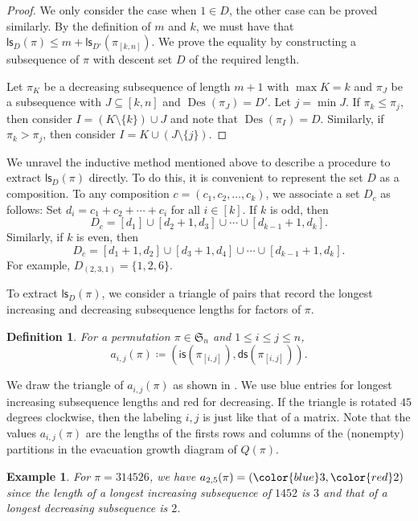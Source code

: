 \documentclass[12pt]{article}
\newcommand{\is}{\mathsf{is}}
\newcommand{\ds}{\mathsf{ds}}
\newcommand{\ls}{\mathsf{ls}}
\newcommand{\Des}{\operatorname{Des}}
\newcommand{\s}{\mathfrak{S}}
\newtheorem{definition}[theorem]{Definition}
\newtheorem{example}[theorem]{Example}
\theoremstyle{definition}
\begin{document}
\begin{proof}
    We only consider the case when $1 \in D$, the other case can be proved similarly. 
    By the definition of $m$ and $k$, we must have that $\ls_D(\pi) \leq m + \ls_{D'}(\pi_{[k, n]})$. 
    We prove the equality by constructing a subsequence of $\pi$ with descent set $D$ of the required length.

    Let $\pi_K$ be a decreasing subsequence of length $m + 1$ with $\max K = k$ and $\pi_J$ be a subsequence with $J \subseteq [k, n]$ and $\Des(\pi_J) = D'$. 
    Let $j = \min J$. 
    If $\pi_k \leq \pi_j$, then consider $I = (K \setminus \{k\}) \cup J$ and note that $\Des(\pi_I) = D$. 
    Similarly, if $\pi_k > \pi_j$, then consider $I = K \cup (J \setminus \{j\})$.
\end{proof}

We unravel the inductive method mentioned above to describe a procedure to extract $\ls_D(\pi)$ directly. 
To do this, it is convenient to represent the set $D$ as a composition. 
To any composition $c = (c_1, c_2, \ldots, c_k)$, we associate a set $D_c$ as follows: 
Set $d_i = c_1 + c_2 + \cdots + c_i$ for all $i \in [k]$. 
If $k$ is odd, then $$D_c = [d_1] \cup [d_2 + 1, d_3] \cup \cdots \cup [d_{k - 1} + 1, d_k].$$
Similarly, if $k$ is even, then $$D_c = [d_1 + 1, d_2] \cup [d_3 + 1, d_4] \cup \cdots \cup [d_{k - 1} + 1, d_k].$$
For example, $D_{(2, 3, 1)} = \{1, 2, 6\}$.

To extract $\ls_D(\pi)$, we consider a triangle of pairs that record the longest increasing and decreasing subsequence lengths for factors of $\pi$.
\begin{definition}
    For a permutation $\pi \in \s_n$ and $1 \leq i \leq j \leq n$,
    \begin{equation*}
        a_{i, j}(\pi) \coloneqq (\is(\pi_{[i, j]}), \ds(\pi_{[i, j]})).
    \end{equation*}
\end{definition}

We draw the triangle of $a_{i, j}(\pi)$ as shown in . 
We use blue entries for longest increasing subsequence lengths and red for decreasing. 
If the triangle is rotated $45$ degrees clockwise, then the labeling $i, j$ is just like that of a matrix. 
Note that the values $a_{i, j}(\pi)$ are the lengths of the firsts rows and columns of the (nonempty) partitions in the evacuation growth diagram of $Q(\pi)$.

\begin{example}
    For $\pi = 314526$, we have $a_{2, 5}(\pi) = ({\color{blue}3}, {\color{red}2})$ since the length of a longest increasing subsequence of $1452$ is $3$ and that of a longest decreasing subsequence is $2$.
\end{example}
\end{document}

